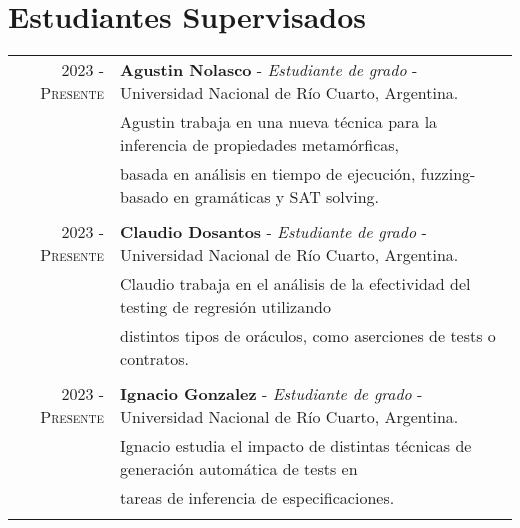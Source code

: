 \documentclass[a4paper,10pt]{article} %
\begin{document}
\section{Estudiantes Supervisados}
\begin{longtable}{rl}

\textsc{2023 - Presente} & \textbf{Agustin Nolasco} - \textit{Estudiante de grado} - Universidad Nacional de Río Cuarto, Argentina. \\ 
& Agustin trabaja en una nueva técnica para la inferencia de propiedades metamórficas, \\ 
& basada en análisis en tiempo de ejecución, fuzzing-basado en gramáticas y SAT solving. \\ & \\

\textsc{2023 - Presente} & \textbf{Claudio Dosantos} - \textit{Estudiante de grado} - Universidad Nacional de Río Cuarto, Argentina. \\
& Claudio trabaja en el análisis de la efectividad del testing de regresión utilizando \\ 
& distintos tipos de oráculos, como aserciones de tests o contratos. \\ & \\

\textsc{2023 - Presente} & \textbf{Ignacio Gonzalez} - \textit{Estudiante de grado} - Universidad Nacional de Río Cuarto, Argentina. \\
& Ignacio estudia el impacto de distintas técnicas de generación automática de tests en  \\ 
& tareas de inferencia de especificaciones. \\ & \\

\end{longtable}
\end{document}
